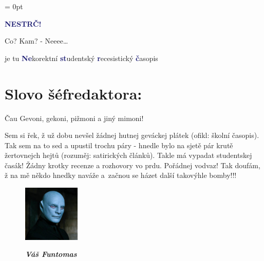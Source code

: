 \documentclass[twoside, 11pt]{article}
\begin{document}
\addtolength{\topmargin}{-10pt}
\addtolength{\textheight}{10pt}
\headheight = 0pt
\begin{center}
    \fontsize{45}{48}\selectfont \textcolor{MidnightBlue}{\textbf{NESTRČ!}}
 \end{center}


\vspace{-\baselineskip}
 \large Co? Kam? - Neeee\dots
 \begin{flushright}
    je tu \textcolor{MidnightBlue}{\textbf{Ne}}korektní \textcolor{MidnightBlue}{\textbf{st}}udentský \textcolor{MidnightBlue}{\textbf{r}}ecesistický \textcolor{MidnightBlue}{\textbf{č}}asopis
 \end{flushright}
 \section*{Slovo šéfredaktora:}
 Čau Gevoni, gekoni, pižmoni a jiný mimoni!

 Sem si řek, ž už dobu nevšel žádnej hutnej geváckej plátek (ofikl: školní
 časopis). Tak sem na to sed a upustil trochu páry - hnedle bylo na sjetě pár
 krutě žertovnejch hejtů (rozuměj: satirických článků). Takle má vypadat
 studentskej časák! Žádny krotky recenze a rozhovory vo prdu. Pořádnej
 vodvaz! Tak doufám, ž na mě někdo hnedky naváže a~začnou se házet další
 takovýhle bomby!!! 

 \begin{figure}
    \vspace*{-13pt}
    \includegraphics[width=0.24\textwidth]{funtomas}
    \vspace*{-10pt}
    \begin{flushright}
        \footnotesize{
        \textit{
        \textbf{Váš Funtomas}}}
    \end{flushright}
\end{figure}
\end{document}
